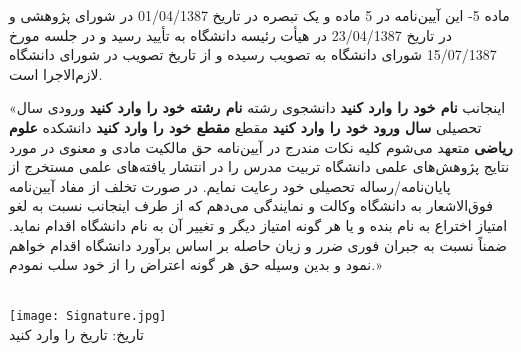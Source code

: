 ماده 5- این آیین‌نامه در 5 ماده و یک تبصره در تاریخ 01/04/1387 در شورای پژوهشی و در تاریخ 23/04/1387 در هیأت رئیسه دانشگاه به تأیید رسید و در جلسه مورخ 15/07/1387 شورای دانشگاه به تصویب رسیده و از تاریخ تصویب در شورای دانشگاه لازم‌الاجرا است.

«اینجانب 
\textbf{
نام خود را وارد کنید
}
دانشجوی رشته 
\textbf{
نام رشته خود را وارد کنید
}
ورودی سال تحصیلی 
\textbf{
سال ورود خود را وارد کنید
}
مقطع 
\textbf{
مقطع خود را وارد کنید
}
دانشکده 
\textbf{
علوم ریاضی 
}
متعهد می‌شوم کلیه نکات مندرج در آیین‌نامه حق مالکیت مادی و معنوی در مورد نتایج پژوهش‌های علمی دانشگاه تربیت مدرس را در انتشار یافته‌های علمی مستخرج از پایان‌نامه/رساله تحصیلی خود رعایت نمایم. در صورت تخلف از مفاد آیین‌نامه فوق‌الاشعار به دانشگاه وکالت و نمایندگی می‌دهم که از طرف اینجانب نسبت به لغو امتیاز اختراع به نام بنده و یا هر گونه امتیاز دیگر و تغییر آن به نام دانشگاه اقدام نماید. ضمناً نسبت به جبران فوری ضرر و زیان حاصله بر اساس برآورد دانشگاه اقدام خواهم نمود و بدین وسیله حق هر گونه اعتراض را از خود سلب نمودم.» 
\begin{flushleft}
\\
\texttt{[image: Signature.jpg]}
\\
تاریخ:
تاریخ را وارد کنید
\end{flushleft}
